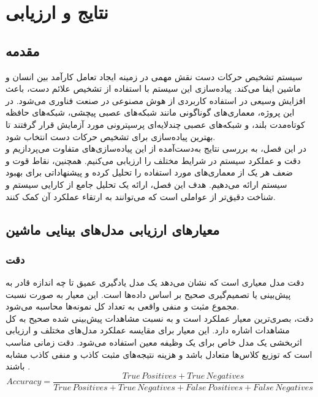 \chapter{نتایج و ارزیابی}
\section{مقدمه}
سیستم تشخیص حرکات دست نقش مهمی در زمینه ایجاد تعامل کارآمد بین انسان و ماشین ایفا می‌کند. پیاده‌سازی این سیستم با استفاده از تشخیص علائم دست، باعث افزایش وسیعی در استفاده کاربردی از هوش مصنوعی  در صنعت فناوری می‌شود. در این پروژه، 
معماری‌های گوناگونی مانند شبکه‌های عصبی پیچشی، شبکه‌های حافظه کوتاه‌مدت بلند، و شبکه‌های عصبی چندلایه‌ای پرسپترونی مورد آزمایش قرار گرفتند تا بهترین پیاده‌سازی برای تشخیص حرکات دست انتخاب شود. 
\\
در این فصل، به بررسی نتایج به‌دست‌آمده از این پیاده‌سازی‌های متفاوت می‌پردازیم و دقت و عملکرد سیستم در شرایط مختلف را ارزیابی می‌کنیم. همچنین، نقاط قوت و ضعف هر یک از معماری‌های مورد استفاده 
را تحلیل کرده و پیشنهاداتی برای بهبود سیستم ارائه می‌دهیم. هدف این فصل، ارائه یک تحلیل جامع از کارایی سیستم و شناخت دقیق‌تر از عواملی است که می‌توانند به ارتقاء عملکرد آن کمک کنند.


\section{معیارهای ارزیابی مدل‌های بینایی ماشین }

\subsection{دقت}
دقت مدل معیاری است که نشان می‌دهد یک مدل یادگیری عمیق تا چه اندازه قادر به پیش‌بینی یا تصمیم‌گیری صحیح بر اساس داده‌ها است. این معیار به صورت نسبت مجموع مثبت و منفی واقعی به تعداد کل نمونه‌ها محاسبه می‌شود.
\\
دقت، بصری‌ترین معیار عملکرد است و به نسبت مشاهدات پیش‌بینی شده صحیح به کل مشاهدات اشاره دارد. این معیار برای مقایسه عملکرد مدل‌های مختلف و ارزیابی اثربخشی یک مدل خاص برای یک وظیفه معین استفاده می‌شود. دقت زمانی مناسب است که توزیع کلاس‌ها متعادل باشد و هزینه‌ نتیجه‌های مثبت کاذب و منفی کاذب مشابه باشند \cite{Accuracy53:online}.
\begin{equation}
    Accuracy = \frac{True \, Positives + True \, Negatives}{True \, Positives + True \, Negatives + False \, Positives + False \, Negatives}
\end{equation}


